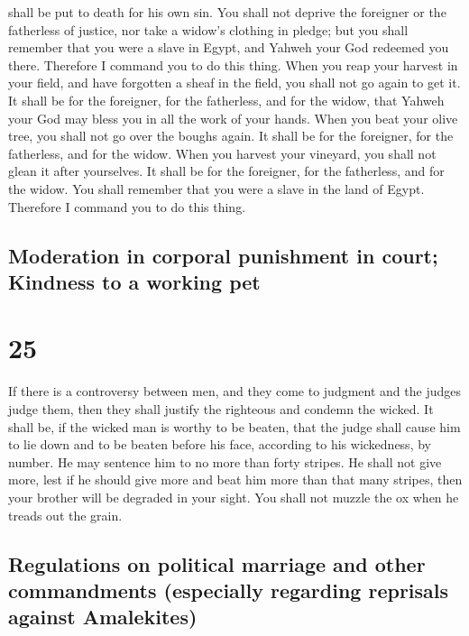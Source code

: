 shall be put to death for his own sin.  You shall not
deprive the foreigner or the fatherless of justice, nor take a widow's
clothing in pledge;  but you shall remember that you were
a slave in Egypt, and Yahweh your God redeemed you there. Therefore I
command you to do this thing.  When you reap your harvest
in your field, and have forgotten a sheaf in the field, you shall not go
again to get it. It shall be for the foreigner, for the fatherless, and
for the widow, that Yahweh your God may bless you in all the work of
your hands.  When you beat your olive tree, you shall not
go over the boughs again. It shall be for the foreigner, for the
fatherless, and for the widow.  When you harvest your
vineyard, you shall not glean it after yourselves. It shall be for the
foreigner, for the fatherless, and for the widow.  You
shall remember that you were a slave in the land of Egypt. Therefore I
command you to do this thing.

\hypertarget{moderation-in-corporal-punishment-in-court-kindness-to-a-working-pet}{%
\subsection{Moderation in corporal punishment in court; Kindness to a
working
pet}\label{moderation-in-corporal-punishment-in-court-kindness-to-a-working-pet}}

\hypertarget{section-24}{%
\section{25}\label{section-24}}

 If there is a controversy between men, and they come to
judgment and the judges judge them, then they shall justify the
righteous and condemn the wicked.  It shall be, if the
wicked man is worthy to be beaten, that the judge shall cause him to lie
down and to be beaten before his face, according to his wickedness, by
number.  He may sentence him to no more than forty
stripes. He shall not give more, lest if he should give more and beat
him more than that many stripes, then your brother will be degraded in
your sight.  You shall not muzzle the ox when he treads
out the grain.

\hypertarget{regulations-on-political-marriage-and-other-commandments-especially-regarding-reprisals-against-amalekites}{%
\subsection{Regulations on political marriage and other commandments
(especially regarding reprisals against
Amalekites)}\label{regulations-on-political-marriage-and-other-commandments-especially-regarding-reprisals-against-amalekites}}

